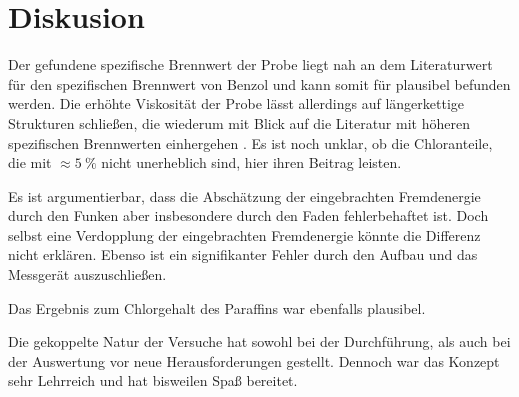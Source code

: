 \chapter{Diskusion}
	Der gefundene spezifische Brennwert der Probe liegt nah an dem Literaturwert für den spezifischen Brennwert von Benzol und kann
	somit für plausibel befunden werden. Die erhöhte Viskosität der Probe lässt allerdings auf längerkettige Strukturen schließen, die
	wiederum mit Blick auf die Literatur mit höheren spezifischen Brennwerten einhergehen \cite{Tabellenbuch.chemie.Wachter.2012}. Es ist noch unklar, ob die Chloranteile,
	die mit \(\approx \SI{5}{\percent}\) nicht unerheblich sind, hier ihren Beitrag leisten.\par
	Es ist argumentierbar, dass die Abschätzung der eingebrachten Fremdenergie durch den Funken aber insbesondere durch den Faden
	fehlerbehaftet ist. Doch selbst eine Verdopplung der eingebrachten Fremdenergie könnte die Differenz nicht erklären. Ebenso ist
	ein signifikanter Fehler durch den Aufbau und das Messgerät auszuschließen.

	Das Ergebnis zum Chlorgehalt des Paraffins war ebenfalls plausibel.

	Die gekoppelte Natur der Versuche hat sowohl bei der Durchführung, als auch bei der Auswertung vor neue Herausforderungen gestellt.
	Dennoch war das Konzept sehr Lehrreich und hat bisweilen Spaß bereitet.
